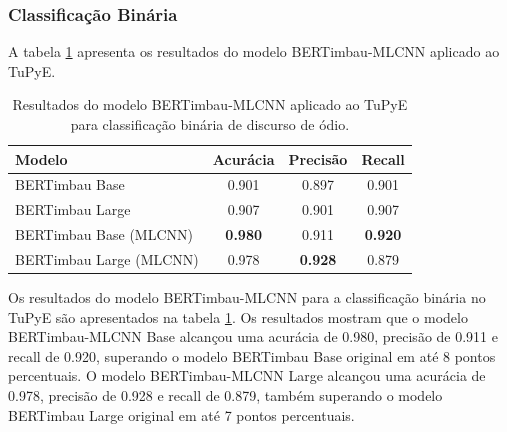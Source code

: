 \documentclass[sigconf,nonacm]{acmart}
\begin{document}
\subsubsection{Classificação Binária}
A tabela \ref{tab:model_comparison_binary_tupye} apresenta os resultados do modelo BERTimbau-MLCNN aplicado ao TuPyE.

\begin{table}[H]
  \centering
  \begin{tabular}{lccc}
    \toprule
    \textbf{Modelo} & \textbf{Acurácia} & \textbf{Precisão} & \textbf{Recall} \\
    \midrule
    BERTimbau Base & 0.901 & 0.897 & 0.901 \\
    BERTimbau Large & 0.907 & 0.901 & 0.907 \\
    BERTimbau Base (MLCNN) & \textbf{0.980} & 0.911 & \textbf{0.920} \\
    BERTimbau Large (MLCNN) & 0.978 & \textbf{0.928} & 0.879 \\
    \bottomrule
  \end{tabular}
  \caption{Resultados do modelo BERTimbau-MLCNN aplicado ao TuPyE para classificação binária de discurso de ódio.}
  \label{tab:model_comparison_binary_tupye}
\end{table}

Os resultados do modelo BERTimbau-MLCNN para a classificação binária no TuPyE são apresentados na tabela \ref{tab:model_comparison_binary_tupye}.
Os resultados mostram que o modelo BERTimbau-MLCNN Base alcançou uma acurácia de 0.980, precisão de 0.911 e recall de 0.920, superando o modelo BERTimbau Base original em até 8 pontos percentuais.
O modelo BERTimbau-MLCNN Large alcançou uma acurácia de 0.978, precisão de 0.928 e recall de 0.879, também superando o modelo BERTimbau Large original em até 7 pontos percentuais.
\end{document}
